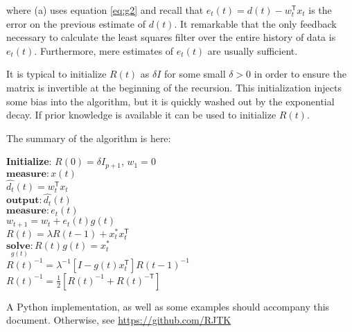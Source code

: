 \documentclass[a4paper, 12pt]{article}
\def\T{\mathsf{T}}
\begin{document}
where (a) uses equation \ref{eq:g2} and recall that $e_t(t) = d(t) - w_t^\T x_t$ is the error on the previous estimate of $d(t)$.  It remarkable that the only feedback necessary to calculate the least squares filter over the entire history of data is $e_t(t)$.  Furthermore, mere estimates of $e_t(t)$ are usually sufficient.

It is typical to initialize $R(t)$ as $\delta I$ for some small $\delta > 0$ in order to ensure the matrix is invertible at the beginning of the recursion.  This initialization injects some bias into the algorithm, but it is quickly washed out by the exponential decay.  If prior knowledge is available it can be used to initialize $R(t)$.

The summary of the algorithm is here:

\begin{algorithm}[H]
\label{alg:RLS}
\KwData{$\delta > 0$, $\lambda \in (0, 1]$, $p \in \mathbb{N}$}
\textbf{Initialize}: $R(0) = \delta I_{p + 1}$, $w_1 = 0$\\
{
  $\textbf{measure}: x(t)$ \\
  $\hat{d_t}(t) = w_t^\T x_t$ \\
  $\textbf{output}: \hat{d_t}(t)$ \\
  $\textbf{measure}: e_t(t)$  \\
  $w_{t + 1} = w_t + e_t(t)g(t)$ \\
  $R(t) = \lambda R(t - 1) + x_t^* x_t^\T$\\
  $\underset{g(t)}{\textbf{solve}:} R(t)g(t) = x_t^*$\\
  $R(t)^{-1} = \lambda^{-1}[I - g(t)x_t^\T]R(t - 1)^{-1}$\\
  $R(t)^{-1} = \frac{1}{2}[R(t)^{-1} + R(t)^{-\T}]$ \\
}
\end{algorithm}

A Python implementation, as well as some examples should accompany this document.  Otherwise, see \url{https://github.com/RJTK}
\end{document}
